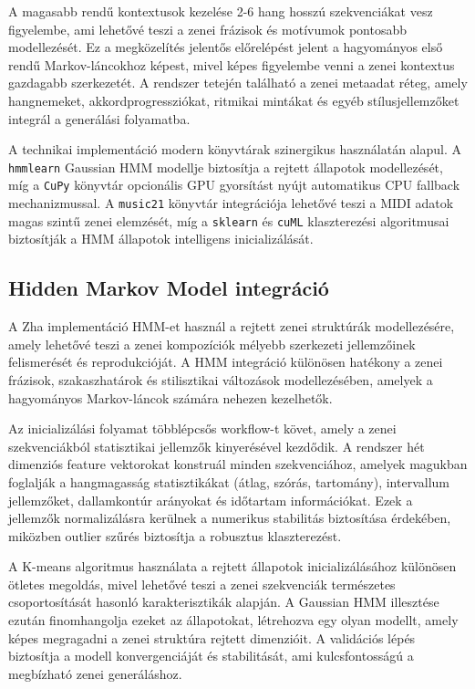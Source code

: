 A magasabb rendű kontextusok kezelése 2-6 hang hosszú szekvenciákat vesz figyelembe, ami lehetővé teszi a zenei frázisok és motívumok pontosabb modellezését. Ez a megközelítés jelentős előrelépést jelent a hagyományos első rendű Markov-láncokhoz képest, mivel képes figyelembe venni a zenei kontextus gazdagabb szerkezetét. A rendszer tetején található a zenei metaadat réteg, amely hangnemeket, akkordprogressziókat, ritmikai mintákat és egyéb stílusjellemzőket integrál a generálási folyamatba.

A technikai implementáció modern könyvtárak szinergikus használatán alapul. A \texttt{hmmlearn} Gaussian HMM modellje biztosítja a rejtett állapotok modellezését, míg a \texttt{CuPy} könyvtár opcionális GPU gyorsítást nyújt automatikus CPU fallback mechanizmussal. A \texttt{music21} könyvtár integrációja lehetővé teszi a MIDI adatok magas szintű zenei elemzését, míg a \texttt{sklearn} és \texttt{cuML} klaszterezési algoritmusai biztosítják a HMM állapotok intelligens inicializálását.

\subsection{Hidden Markov Model integráció}

A Zha implementáció HMM-et használ a rejtett zenei struktúrák modellezésére, amely lehetővé teszi a zenei kompozíciók mélyebb szerkezeti jellemzőinek felismerését és reprodukcióját. A HMM integráció különösen hatékony a zenei frázisok, szakaszhatárok és stilisztikai változások modellezésében, amelyek a hagyományos Markov-láncok számára nehezen kezelhetők.

Az inicializálási folyamat többlépcsős workflow-t követ, amely a zenei szekvenciákból statisztikai jellemzők kinyerésével kezdődik. A rendszer hét dimenziós feature vektorokat konstruál minden szekvenciához, amelyek magukban foglalják a hangmagasság statisztikákat (átlag, szórás, tartomány), intervallum jellemzőket, dallamkontúr arányokat és időtartam információkat. Ezek a jellemzők normalizálásra kerülnek a numerikus stabilitás biztosítása érdekében, miközben outlier szűrés biztosítja a robusztus klaszterezést.

A K-means algoritmus használata a rejtett állapotok inicializálásához különösen ötletes megoldás, mivel lehetővé teszi a zenei szekvenciák természetes csoportosítását hasonló karakterisztikák alapján. A Gaussian HMM illesztése ezután finomhangolja ezeket az állapotokat, létrehozva egy olyan modellt, amely képes megragadni a zenei struktúra rejtett dimenzióit. A validációs lépés biztosítja a modell konvergenciáját és stabilitását, ami kulcsfontosságú a megbízható zenei generáláshoz.

